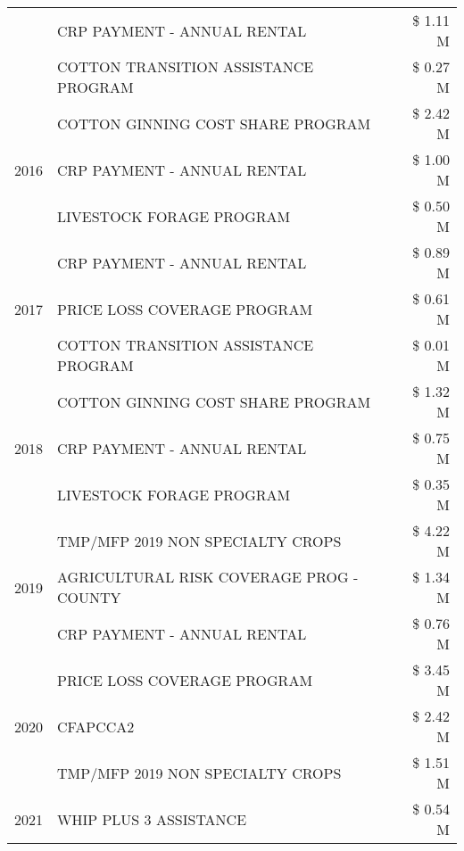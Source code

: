 \begin{tabular}{llr}
 & CRP PAYMENT - ANNUAL RENTAL & \$ 1.11 M \\
 & COTTON TRANSITION ASSISTANCE PROGRAM & \$ 0.27 M \\
\cline{1-3}
\multirow[t]{3}{*}{2016} & COTTON GINNING COST SHARE PROGRAM & \$ 2.42 M \\
 & CRP PAYMENT - ANNUAL RENTAL & \$ 1.00 M \\
 & LIVESTOCK FORAGE PROGRAM & \$ 0.50 M \\
\cline{1-3}
\multirow[t]{3}{*}{2017} & CRP PAYMENT - ANNUAL RENTAL & \$ 0.89 M \\
 & PRICE LOSS COVERAGE PROGRAM & \$ 0.61 M \\
 & COTTON TRANSITION ASSISTANCE PROGRAM & \$ 0.01 M \\
\cline{1-3}
\multirow[t]{3}{*}{2018} & COTTON GINNING COST SHARE PROGRAM & \$ 1.32 M \\
 & CRP PAYMENT - ANNUAL RENTAL & \$ 0.75 M \\
 & LIVESTOCK FORAGE PROGRAM & \$ 0.35 M \\
\cline{1-3}
\multirow[t]{3}{*}{2019} & TMP/MFP 2019 NON SPECIALTY CROPS & \$ 4.22 M \\
 & AGRICULTURAL RISK COVERAGE PROG - COUNTY & \$ 1.34 M \\
 & CRP PAYMENT - ANNUAL RENTAL & \$ 0.76 M \\
\cline{1-3}
\multirow[t]{3}{*}{2020} & PRICE LOSS COVERAGE PROGRAM & \$ 3.45 M \\
 & CFAPCCA2 & \$ 2.42 M \\
 & TMP/MFP 2019 NON SPECIALTY CROPS & \$ 1.51 M \\
\cline{1-3}
2021 & WHIP PLUS 3 ASSISTANCE & \$ 0.54 M \\
\cline{1-3}
\bottomrule
\end{tabular}
